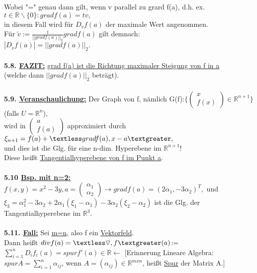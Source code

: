 \documentclass[]{scrartcl}
\begin{document}
	Wobei "=" genau dann gilt, wenn v parallel zu grard f(a), d.h. ex. $t\in\mathbb{R}\backslash\{0\}: grad f(a)=tv,$\\
	in diesem Fall wird für $D_vf(a)$ der maximale Wert angenommen.\\
	Für $\tilde{v}:=\frac{1}{||grad f(a)||_2} grad f(a)$ gilt demnach:\\
	$|D_{\tilde{v}}f(a)|=||grad f(a)||_2.$\\
	\\
	\textbf{5.8. \underline{FAZIT:}} \ul{grad f(a) ist die 
	Richtung maximaler Steigung von f in a}\\
	(welche dann $||grad f(a)||_2$ beträgt).\\
	\\
	\textbf{5.9. \underline{Veranschaulichung:}} Der Graph von f, nämlich 
	G(f):$\{\begin{pmatrix}
		x\\f(x)
	\end{pmatrix}\in\mathbb{R}^{n+1}\}$ (falls $U=\mathbb{R}^n$),\\
	wird in $\begin{pmatrix}
		a\\f(a)
	\end{pmatrix}$ approximiert durch\\
	$\xi_{n+1}= f(a)+\textless grad f(a), x-a\textgreater,$\\
	und dies ist die Glg. für eine n-dim. Hyperebene im $\mathbb{R}^{n+1}$!\\
	Diese heißt \ul{Tangentialhyperebene von f im Punkt a}.\\
	\\
	\textbf{5.10 \underline{Bsp. mit n=2:}} $f(x,y)=x^2-3y, a=\begin{pmatrix}
		\alpha_1\\\alpha_2
	\end{pmatrix}	\rightarrow grad f(a)=(2\alpha_1,-3\alpha_2)^T,$ und\\
	$\xi_3=\alpha_1^2-3\alpha_2+2\alpha_1(\xi_1-\alpha_1)-3\alpha_2(\xi_2-\alpha_2)$ ist die Glg. der Tangentialhyperebene im $\mathbb{R}^3.$\\
	\\
	\textbf{5.11. \underline{Fall:}} Sei \underline{\underline{m=n}}, also f ein \underline{Vektorfeld}.\\
	Dann heißt \ul{$div f(a)=\textless \triangledown, f\textgreater(a)$}:=$\sum_{i=1}^{n}D_if_i(a)=spur f'(a)\in\mathbb{R}\leftarrow$ [Erinnerung Lineare Algebra: $spur A = \sum_{i=1}^{n}\alpha_{ij}$, wenn $A=(\alpha_{ij})\in \mathbb{R}^{m x n}$, heißt \ul{Spur} der Matrix A.]\\
\end{document}
